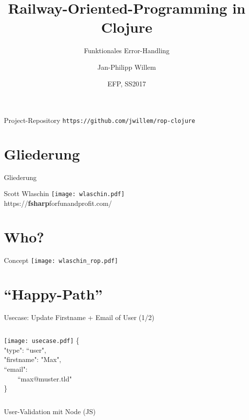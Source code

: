 \documentclass[compress]{beamer}
\title{Railway-Oriented-Programming \break in Clojure}
\subtitle{Funktionales Error-Handling}
\author{Jan-Philipp Willem}
\institute{Fakultät für Informatik\\Hochschule Mannheim}
\date{EFP, SS2017}
\begin{document}

\maketitle

\begin{frame}{Project-Repository}
  \texttt{https://github.com/jwillem/rop-clojure}
\end{frame}

\section*{Gliederung}
\begin{frame}{Gliederung}
  \tableofcontents[hideallsubsections]
\end{frame}

\begin{frame}{Scott Wlaschin}
  \setcounter{framenumber}{1}
\texttt{[image: wlaschin.pdf]}
\\[4pt]
https://\textbf{fsharp}forfunandprofit.com/
\end{frame}

\section["`Langes langes Zitat, Lorem Ipsum, weil deswegen und so weiter. Foobar is barbaz and so on."' \small{(Scott Wlaschin, Conference 2015)[1]}]{Who?}

\begin{frame}{Concept}
  \setcounter{framenumber}{3}
\texttt{[image: wlaschin\_rop.pdf]}
\end{frame}

\section{"`Happy-Path"'}
  \begin{frame}{Usecase: Update Firstname + Email of User (1/2)}
    \begin{columns}[c]
        \texttt{[image: usecase.pdf]}
    \{\\
      "type": ``user",\\
      "firstname": "Max",\\
      ``email": \\~~~~``max@muster.tld"\\
    \}
    \end{columns}
  \end{frame}
  \begin{frame}{User-Validation mit Node (JS)}
  \end{frame}
\end{document}
